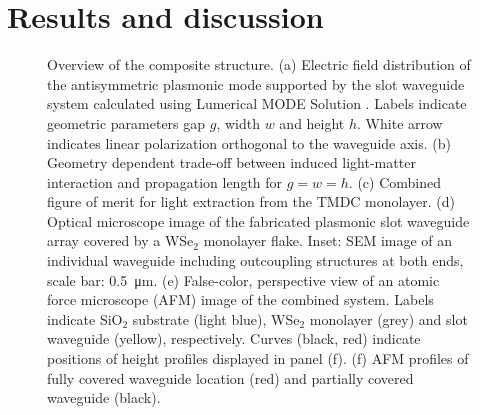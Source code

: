 \documentclass[journal=nalefd,manuscript=letter]{achemso}
\newcommand{\figurescale}{1}
\begin{document}
\section{Results and discussion}
\begin{figure}[!ht]
\scalebox{\figurescale}{\texttt{[image: fig1.pdf]}}
\renewcommand{\figurename}{Figure}
\caption{\label{fig1}
%
Overview of the composite structure.
(a) Electric field distribution of the antisymmetric plasmonic mode supported by the slot waveguide system calculated using Lumerical MODE Solution \cite{LumericalSolutionsInc..}. Labels indicate geometric parameters gap $g$, width $w$ and height $h$. White arrow indicates linear polarization orthogonal to the waveguide axis.
(b) Geometry dependent trade-off between induced light-matter interaction and propagation length for $g = w = h$.
(c) Combined figure of merit for light extraction from the TMDC monolayer.
(d) Optical microscope image of the fabricated plasmonic slot waveguide array covered by a WSe$_2$ monolayer flake. Inset: SEM image of an individual waveguide including outcoupling structures at both ends, scale bar: \SI{0.5}{\micro\meter}.
(e) False-color, perspective view of an atomic force microscope (AFM) image of the combined system. Labels indicate SiO$_2$ substrate (light blue), WSe$_2$ monolayer (grey) and slot waveguide (yellow), respectively. Curves (black, red) indicate positions of height profiles displayed in panel (f).
(f) AFM profiles of fully covered waveguide location (red) and partially covered waveguide (black).
}
\end{figure}
\end{document}
